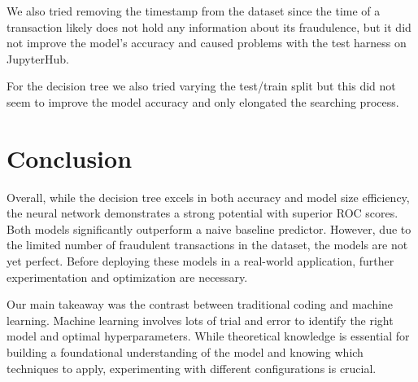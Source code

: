 \documentclass[a4paper, 10pt, conference]{ieeeconf}      %
\begin{document}
We also tried removing the timestamp from the dataset since the time of a transaction likely does not hold any information about its fraudulence, but it did not improve the model's accuracy and caused problems with the test harness on JupyterHub.

For the decision tree we also tried varying the test/train split but this did not seem to improve the model accuracy and only elongated the searching process.

\section{Conclusion}
\label{sec:con}
Overall, while the decision tree excels in both accuracy and model size efficiency, the neural network demonstrates a strong potential with superior ROC scores.
Both models significantly outperform a naive baseline predictor. However, due to the limited number of fraudulent transactions in the dataset, the models are not yet perfect. 
Before deploying these models in a real-world application, further experimentation and optimization are necessary.

Our main takeaway was the contrast between traditional coding and machine learning. 
Machine learning involves lots of trial and error to identify the right model and optimal hyperparameters. 
While theoretical knowledge is essential for building a foundational understanding of the model and knowing which techniques to apply, 
experimenting with different configurations is crucial.

\end{document}
